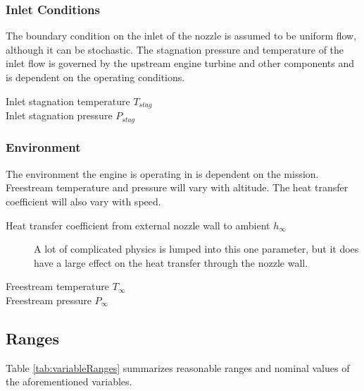 \documentclass{article}
\begin{document}
\subsubsection{Inlet Conditions}
The boundary condition on the inlet of the nozzle is assumed to be uniform flow, although it can be stochastic. The stagnation pressure and temperature of the inlet flow is governed by the upstream engine turbine and other components and is dependent on the operating conditions.
\begin{description}
\item[Inlet stagnation temperature $T_{stag}$] 
\item[Inlet stagnation pressure $P_{stag}$]
\end{description}

\subsubsection{Environment}
The environment the engine is operating in is dependent on the mission. Freestream temperature and pressure will vary with altitude. The heat transfer coefficient will also vary with speed.
\begin{description}
\item[Heat transfer coefficient from external nozzle wall to ambient $h_{\infty}$] A lot of complicated physics is lumped into this one parameter, but it does have a large effect on the heat transfer through the nozzle wall.
\item[Freestream temperature $T_{\infty}$]
\item[Freestream pressure $P_{\infty}$]
\end{description}

\subsection{Ranges}

Table \ref{tab:variableRanges} summarizes reasonable ranges and nominal values of the aforementioned variables.
\end{document}

